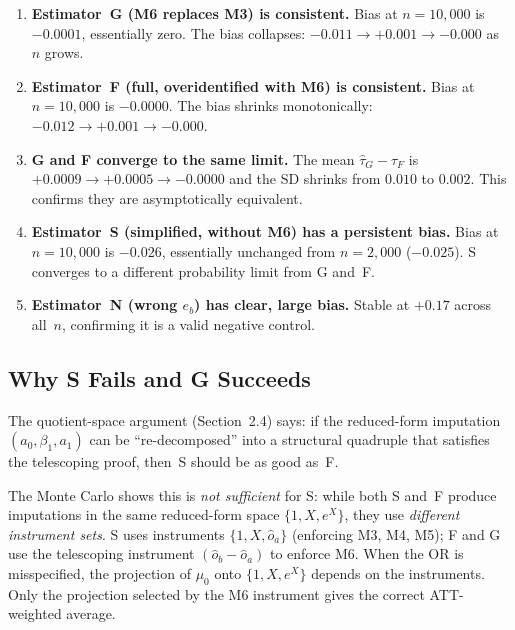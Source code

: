 \documentclass[11pt,letterpaper]{article}
\begin{document}
\begin{enumerate}
  \item \textbf{Estimator~G (M6 replaces M3) is consistent.}
    Bias at $n = 10{,}000$ is $-0.0001$, essentially zero.  The bias
    collapses: $-0.011 \to +0.001 \to -0.000$ as $n$ grows.

  \item \textbf{Estimator~F (full, overidentified with M6) is consistent.}
    Bias at $n = 10{,}000$ is $-0.0000$.  The bias
    shrinks monotonically: $-0.012 \to +0.001 \to -0.000$.

  \item \textbf{G and F converge to the same limit.}
    The mean $\hat\tau_G - \hat\tau_F$ is $+0.0009 \to +0.0005 \to
    -0.0000$ and the SD shrinks from $0.010$ to $0.002$.  This
    confirms they are asymptotically equivalent.

  \item \textbf{Estimator~S (simplified, without M6) has a persistent bias.}
    Bias at $n = 10{,}000$ is $-0.026$, essentially unchanged from
    $n = 2{,}000$ ($-0.025$).  S converges to a different
    probability limit from G and~F.

  \item \textbf{Estimator~N (wrong $e_b$) has clear, large bias.}
    Stable at $+0.17$ across all~$n$, confirming it is a valid negative
    control.
\end{enumerate}


\subsection{Why S Fails and G Succeeds}

The quotient-space argument (Section~2.4) says: if the reduced-form
imputation $(a_0, \beta_1, a_1)$ can be ``re-decomposed'' into a
structural quadruple that satisfies the telescoping proof, then~S
should be as good as~F.

The Monte Carlo shows this is \emph{not sufficient} for S: while
both S and~F produce imputations in the same reduced-form
space $\{1, X, e^X\}$, they use \emph{different instrument sets}.
S uses instruments $\{1, X, \hat{o}_a\}$ (enforcing M3, M4, M5);
F and G use the telescoping instrument $(\hat{o}_b - \hat{o}_a)$
to enforce M6.  When the OR is misspecified, the projection of
$\mu_0$ onto $\{1, X, e^X\}$ depends on the instruments.  Only
the projection selected by the M6 instrument gives the correct
ATT-weighted average.
\end{document}
